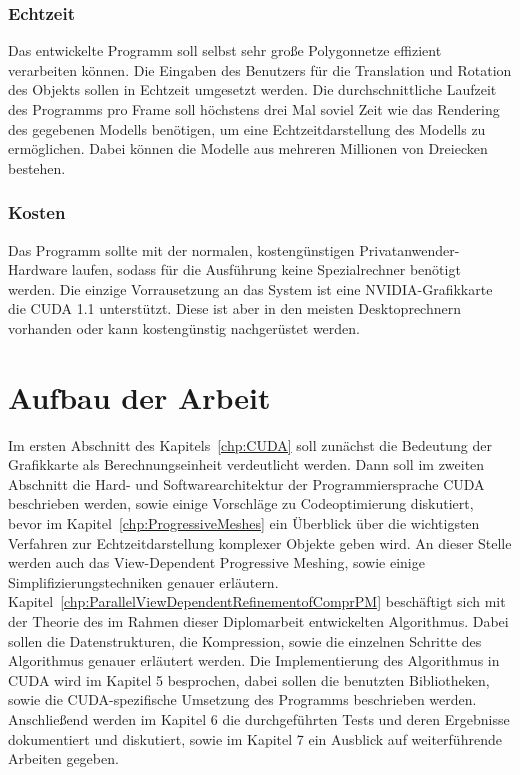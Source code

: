 \subsubsection{Echtzeit} 
Das entwickelte Programm soll selbst sehr große Polygonnetze effizient verarbeiten können. Die Eingaben des Benutzers für die Translation und Rotation des Objekts sollen in Echtzeit umgesetzt werden. Die durchschnittliche Laufzeit des Programms pro Frame soll höchstens drei Mal soviel Zeit wie das Rendering des gegebenen Modells benötigen, um eine Echtzeitdarstellung des Modells zu ermöglichen. Dabei können die Modelle aus mehreren Millionen von Dreiecken bestehen.

\subsubsection{Kosten} 
Das Programm sollte mit der normalen, kostengünstigen Privatanwender-Hardware laufen, sodass für die Ausführung keine Spezialrechner benötigt werden. Die einzige Vorrausetzung an das System ist eine NVIDIA-Grafikkarte die CUDA 1.1 unterstützt. Diese ist aber in den meisten Desktoprechnern vorhanden oder kann kostengünstig nachgerüstet werden. 

\section{Aufbau der Arbeit}
Im ersten Abschnitt des Kapitels~\ref{chp:CUDA} soll zunächst die Bedeutung der Grafikkarte als Berechnungseinheit verdeutlicht werden. Dann soll  im zweiten Abschnitt die Hard- und Softwarearchitektur der Programmiersprache \acs{CUDA} beschrieben werden, sowie einige Vorschläge zu Codeoptimierung diskutiert, bevor im Kapitel~\ref{chp:ProgressiveMeshes} ein Überblick über die wichtigsten Verfahren zur Echtzeitdarstellung komplexer Objekte geben wird. An dieser Stelle werden auch das View-Dependent Progressive Meshing, sowie einige Simplifizierungstechniken genauer erläutern.        Kapitel~\ref{chp:ParallelViewDependentRefinementofComprPM} beschäftigt sich mit der Theorie des im Rahmen dieser Diplomarbeit entwickelten Algorithmus. Dabei sollen die Datenstrukturen, die Kompression, sowie die einzelnen Schritte des Algorithmus genauer erläutert werden. Die Implementierung des Algorithmus in \acs{CUDA} wird im Kapitel 5 besprochen, dabei sollen die benutzten Bibliotheken, sowie die \acs{CUDA}-spezifische Umsetzung des Programms beschrieben werden. Anschließend werden im Kapitel 6 die durchgeführten Tests und deren Ergebnisse dokumentiert und diskutiert, sowie im Kapitel 7 ein Ausblick auf weiterführende Arbeiten gegeben. 


